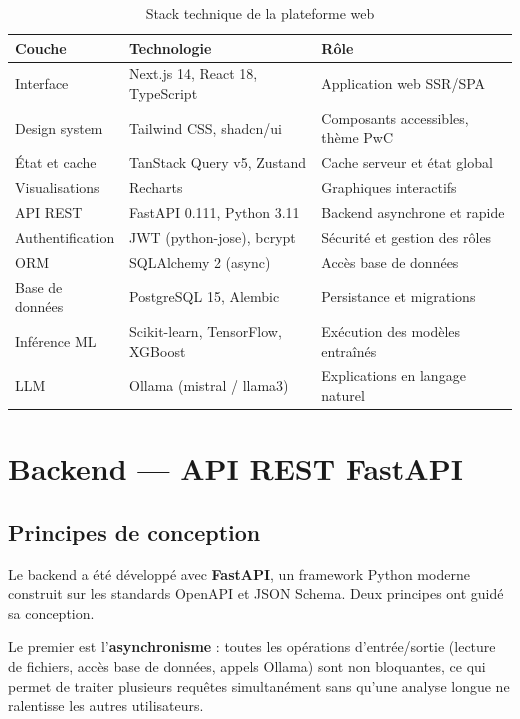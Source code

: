 \documentclass[12pt,a4paper,twoside]{report}
\begin{document}
\begin{table}[H]
\centering
\caption{Stack technique de la plateforme web}
\label{tab:stack_tech}
\begin{tabular}{lll}
\toprule
\textbf{Couche} & \textbf{Technologie} & \textbf{Rôle} \\
\midrule
Interface        & Next.js 14, React 18, TypeScript    & Application web SSR/SPA \\
Design system    & Tailwind CSS, shadcn/ui             & Composants accessibles, thème PwC \\
État et cache    & TanStack Query v5, Zustand          & Cache serveur et état global \\
Visualisations   & Recharts                            & Graphiques interactifs \\
API REST         & FastAPI 0.111, Python 3.11          & Backend asynchrone et rapide \\
Authentification & JWT (python-jose), bcrypt           & Sécurité et gestion des rôles \\
ORM              & SQLAlchemy 2 (async)                & Accès base de données \\
Base de données  & PostgreSQL 15, Alembic              & Persistance et migrations \\
Inférence ML     & Scikit-learn, TensorFlow, XGBoost   & Exécution des modèles entraînés \\
LLM              & Ollama (mistral / llama3)           & Explications en langage naturel \\
\bottomrule
\end{tabular}
\end{table}


\section{Backend --- API REST FastAPI}

\subsection{Principes de conception}

Le backend a été développé avec \textbf{FastAPI}, un framework Python moderne construit sur les standards OpenAPI et JSON Schema. Deux principes ont guidé sa conception.

Le premier est l'\textbf{asynchronisme} : toutes les opérations d'entrée/sortie (lecture de fichiers, accès base de données, appels Ollama) sont non bloquantes, ce qui permet de traiter plusieurs requêtes simultanément sans qu'une analyse longue ne ralentisse les autres utilisateurs.
\end{document}
